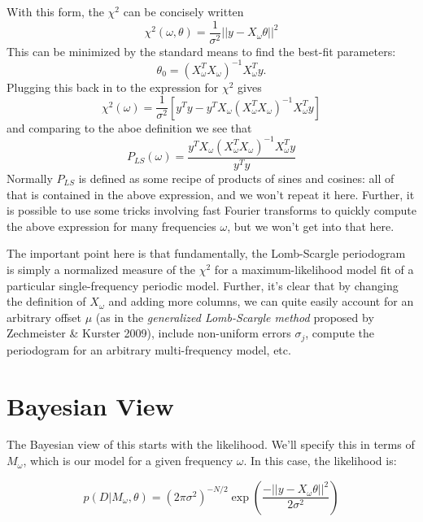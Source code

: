 \documentclass[12pt,pdftex]{article}
\begin{document}
With this form, the $\chi^2$ can be concisely written
\begin{equation}
\chi^2(\omega, \theta) = \frac{1}{\sigma^2}||y - X_\omega \theta||^2
\end{equation}
This can be minimized by the standard means to find the best-fit parameters:
\begin{equation}
  \theta_0 = (X_\omega^TX_\omega)^{-1}X_\omega^Ty.
\end{equation}
Plugging this back in to the expression for $\chi^2$ gives
\begin{equation}
  \chi^2(\omega) = \frac{1}{\sigma^2}\left[
    y^Ty - y^TX_\omega(X_\omega^TX_\omega)^{-1}X_\omega^Ty
    \right]
\end{equation}
and comparing to the aboe definition we see that
\begin{equation}
  P_{LS}(\omega) = \frac{y^TX_\omega(X_\omega^TX_\omega)^{-1}X_\omega^Ty}{y^Ty}
\end{equation}
Normally $P_{LS}$ is defined as some recipe of products of sines and cosines: all of that is contained in the above expression, and we won't repeat it here. Further, it is possible to use some tricks involving fast Fourier transforms to quickly compute the above expression for many frequencies $\omega$, but we won't get into that here.

The important point here is that fundamentally, the Lomb-Scargle periodogram is simply a normalized measure of the $\chi^2$ for a maximum-likelihood model fit of a particular single-frequency periodic model. Further, it's clear that by changing the definition of $X_\omega$ and adding more columns, we can quite easily account for an arbitrary offset $\mu$ (as in the {\it generalized Lomb-Scargle method} proposed by Zechmeister \& Kurster 2009), include non-uniform errors $\sigma_j$, compute the periodogram for an arbitrary multi-frequency model, etc.

\section{Bayesian View}
The Bayesian view of this starts with the likelihood. We'll specify this in terms of $M_\omega$, which is our model for a given frequency $\omega$. In this case, the likelihood is:

\begin{equation}
  p(D|M_\omega,\theta) =
  (2\pi\sigma^2)^{-N/2} \exp\left(
  \frac{-||y - X_\omega\theta||^2}{2\sigma^2}
  \right)
\end{equation}
\end{document}
